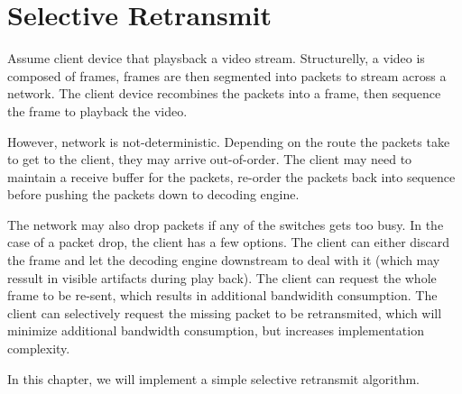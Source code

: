 \chapter{Selective Retransmit}

Assume client device that playsback a video stream. Structurelly, a video is
composed of frames, frames are then segmented into packets to stream across a 
network. The client device recombines the packets into a frame, then sequence
the frame to playback the video.\newline

However, network is not-deterministic. Depending on the route the packets take
to get to the client, they may arrive out-of-order. The client may need to
maintain a receive buffer for the packets, re-order the packets back into
sequence before pushing the packets down to decoding engine.\newline

The network may also drop packets if any of the switches gets too busy. In the
case of a packet drop, the client has a few options. The client can either
discard the frame and let the decoding engine downstream to deal with it (which
may ressult in  visible artifacts during play back). The client can request the
whole frame to be re-sent, which results in additional bandwidith consumption.
The client can selectively request the missing packet to be retransmited, which
will minimize additional bandwidth consumption, but increases implementation 
complexity.\newline 

In this chapter, we will implement a simple selective retransmit
algorithm.\newline

